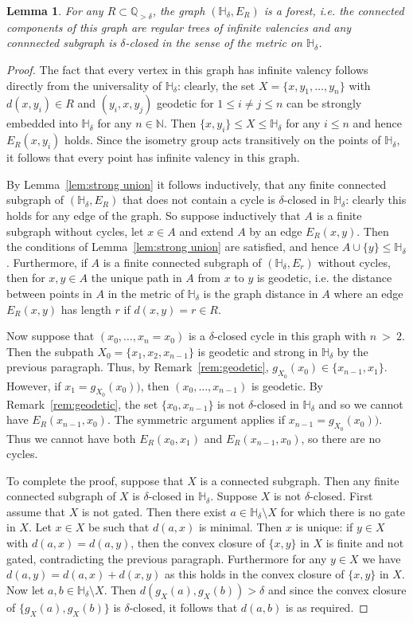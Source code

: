 \documentclass{amsart}
\renewcommand{\d}{\delta}
\renewcommand{\H}{\mathbb{H}}
\newtheorem{lemma}[defi]{Lemma}
\begin{document}
\begin{lemma}\label{lem:tree}
For any $R\subset\mathbb{Q}_{> \d}$, the graph $(\H_\d,E_R)$ is a forest, i.e. the connected components of this graph are regular trees of infinite valencies and any connnected subgraph is   $\d$-closed in the sense of the metric on $\H_\d$.
\end{lemma}
\begin{proof}
The fact that every vertex in this graph has infinite valency follows directly from the universality of $\H_\d$: clearly,  the set $X=\{x,y_1,\ldots, y_n\}$ with $d(x,y_i)\in R$ and $ (y_i,x,y_j)$ geodetic for $ 1\leq i\neq j\leq n$ can be strongly embedded into $\H_\d$ for any $n\in\mathbb{N}$. Then $\{x,y_i\}\leq X\leq \H_\d$ for any $i\leq n$ and hence $E_R(x,y_i)$ holds. Since the isometry group acts transitively on the points of $\H_\d$, it follows that every point has infinite valency in this graph.

By Lemma~\ref{lem:strong union} it follows inductively, that any finite connected subgraph of $(\H_\d,E_R)$ that does not contain a cycle is   $\d$-closed in $\H_\d$: clearly this holds for any edge of the graph. So suppose inductively that $A$ is a finite subgraph without cycles, let $x\in A$ and extend $A$ by an edge $E_R(x,y)$. Then the conditions of Lemma~\ref{lem:strong union} are satisfied, and hence  $A\cup\{y\}\leq\H_\d$. Furthermore, if $A$ is a finite connected subgraph of $(\H_\d,E_r)$ without cycles, then for $x,y\in A$ the unique path in $A$ from $x$ to $y$ is geodetic, i.e. the distance between points in $A$ in the metric of $\H_\d$ is the graph distance in $A$ where an edge $E_R(x,y)$  has length $r$ if $d(x,y)=r\in R$. 


Now suppose that $(x_0,\ldots, x_n=x_0)$ is a   $\d$-closed cycle in this graph with $n~>~2$. Then the subpath $X_0=\{x_1,x_2, x_{n-1}\}$ is geodetic and strong in $\H_\d$ by the previous paragraph. Thus, by  Remark~\ref{rem:geodetic}, $g_{X_0}(x_0)\in \{x_{n-1}, x_1\}$. However, if $x_1=g_{X_0}(x_0))$, then $(x_0,\ldots, x_{n-1})$ is geodetic. By  Remark~\ref{rem:geodetic}, the set $\{x_0, x_{n-1}\}$ is not   $\d$-closed in $\H_\d$ and so we cannot have $E_R(x_{n-1},x_0)$.  The symmetric argument applies if $x_{n-1}=g_{X_0}(x_0))$. Thus we cannot have both $E_R(x_0,x_1)$ and $E_R(x_{n-1},x_0)$, so there are no cycles.

To complete the proof, suppose that $X$ is a connected subgraph. Then any finite connected subgraph of $X$ is   $\d$-closed in $\H_\d$. Suppose $X$ is not   $\d$-closed. First assume that  $X$ is not gated. Then there exist $a\in\H_\d\setminus X$ for which there is no gate in  $X$. Let $x\in X$ be such that $d(a,x)$ is minimal. Then $x$ is unique: if $y\in X$ with $d(a,x)=d(a,y)$, then the convex closure of $\{x,y\}$ in $X$ is finite and not gated, contradicting the previous paragraph. Furthermore for any $y\in X$ we have $d(a,y)=d(a,x)+d(x,y)$ as this holds in the convex closure of  $\{x,y\}$ in $X$.
Now let $a,b\in \H_\d\setminus X$. Then $d(g_X(a),g_X(b))>\d$ and since the convex closure of $\{g_X(a),g_X(b)\}$ is   $\d$-closed, it follows that $d(a,b)$ is as required.

\end{proof}
\end{document}
